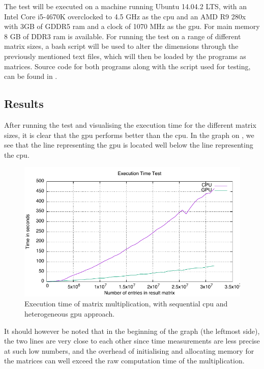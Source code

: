 The test will be executed on a machine running Ubuntu 14.04.2 LTS, with an Intel Core i5-4670K overclocked to 4.5 GHz as the \acrshort{cpu} and an AMD R9 280x with 3GB of GDDR5 ram and a clock of 1070 MHz as the \acrshort{gpu}.
For main memory 8 GB of DDR3 ram is available.
For running the test on a range of different matrix sizes, a bash script will be used to alter the dimensions through the previously mentioned text files, which will then be loaded by the programs as matrices.
Source code for both programs along with the script used for testing, can be found in .

\subsection{Results} %
\label{sub:results}
After running the test and visualising the execution time for the different matrix sizes, it is clear that the \acrshort{gpu} performs better than the \acrshort{cpu}.
In the graph on , we see that the line representing the \acrshort{gpu} is located well below the line representing the \acrshort{cpu}.   
\begin{figure}[h]
    \centering
    \includegraphics{figures/tests/graph.pdf}
    \caption{Execution time of matrix multiplication, with sequential \acrshort{cpu} and heterogeneous \acrshort{gpu} approach. }\label{fig:test_results}
\end{figure} 
It should however be noted that in the beginning of the graph (the leftmost side), the two lines are very close to each other since time measurements are less precise at such low numbers, and the overhead of initialising and allocating memory for the matrices can well exceed the raw computation time of the multiplication. 

